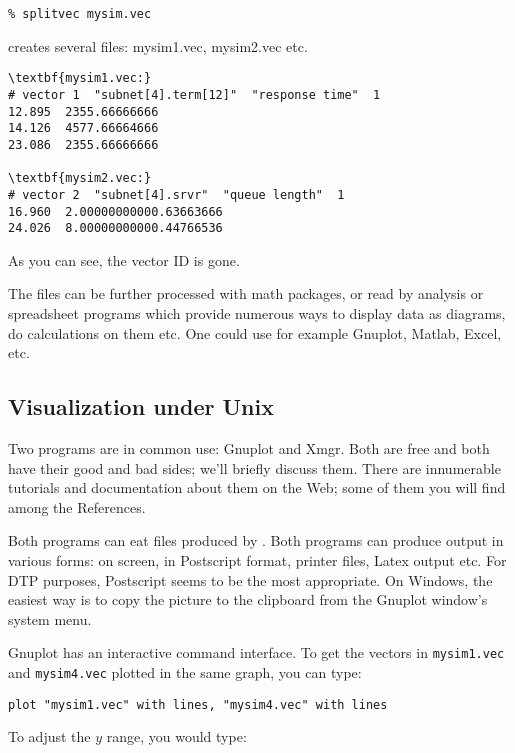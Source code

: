 \begin{verbatim}
% splitvec mysim.vec
\end{verbatim}


creates several files: mysim1.vec, mysim2.vec etc.

\begin{Verbatim}[commandchars=\\\{\}]
\textbf{mysim1.vec:}
# vector 1  "subnet[4].term[12]"  "response time"  1
12.895  2355.66666666
14.126  4577.66664666
23.086  2355.66666666

\textbf{mysim2.vec:}
# vector 2  "subnet[4].srvr"  "queue length"  1
16.960  2.00000000000.63663666
24.026  8.00000000000.44766536
\end{Verbatim}


As you can see, the vector ID is gone.

The files can be further processed with math packages, or read
by analysis or spreadsheet programs which provide numerous ways
to display data as diagrams, do calculations on them etc. One
could use for example Gnuplot, Matlab, Excel, etc.





\subsection{Visualization under Unix}

Two programs are in common use: Gnuplot and Xmgr. Both are free
and both have their good and bad sides; we'll briefly discuss
them. There are innumerable tutorials and documentation about
them on the Web; some of them you will find among the References.


Both programs can eat files produced by . Both
programs can produce output in various forms: on screen, in Postscript
format, printer files, Latex output etc. For DTP purposes, Postscript
seems to be the most appropriate. On Windows, the easiest way is to
copy the picture to the clipboard from the Gnuplot window's system
menu.


Gnuplot has an interactive command interface. To get the vectors in
\texttt{mysim1.vec} and \texttt{mysim4.vec} plotted in the same graph,
you can type:

\begin{verbatim}
plot "mysim1.vec" with lines, "mysim4.vec" with lines
\end{verbatim}

To adjust the $y$ range, you would type:

